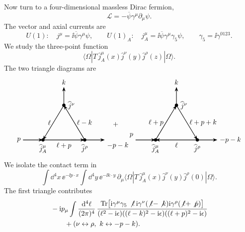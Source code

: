 Now turn to a four-dimensional massless Dirac fermion,
\[
  \mathcal L=-\overline\psi\gamma^\mu\partial_\mu\psi .
\]
The vector and axial currents are
\[
  U(1):\quad
  j^\mu=\ii\overline\psi\gamma^\mu\psi ,
  \qquad
  U(1)_A:\quad
  j_A^\mu=\ii\overline\psi\gamma^\mu\gamma_5\psi ,
  \qquad
  \gamma_5=\ii\gamma^{0123}.
\]
We study the three-point function
\[
  \langle\Omega|
  T\,\widehat j_A^\mu(x)\widehat j^\nu(y)\widehat j^\rho(z)
  |\Omega\rangle .
\]
The two triangle diagrams are
\[
\begin{tikzpicture}[>=Stealth,scale=0.92,baseline={(0,-0.2)},
  fermion/.style={line width=0.75pt},
  current/.style={circle,fill=black,inner sep=1.7pt}]
  \coordinate (A) at (-1.15,-0.85);
  \coordinate (B) at (1.15,-0.85);
  \coordinate (C) at (0,1.05);
  \draw[fermion,->] (A) -- node[below] {\(\ell+p\)} (B);
  \draw[fermion,->] (B) -- node[right] {\(\ell-k\)} (C);
  \draw[fermion,->] (C) -- node[left] {\(\ell\)} (A);
  \draw[fermion,->] (-2.25,-0.85) -- (A);
  \draw[fermion,->] (B) -- (2.25,-0.85);
  \draw[fermion,->] (C) -- (0,2.05);
  \node[current,label=below:\(\widehat j_A^\mu\)] at (A) {};
  \node[current,label=below:\(\widehat j^\rho\)] at (B) {};
  \node[current,label=right:\(\widehat j^\nu\)] at (C) {};
  \node[left] at (-2.25,-0.85) {\(p\)};
  \node[below right] at (2.25,-0.85) {\(-p-k\)};
  \node[above] at (0,2.05) {\(k\)};
  \node at (2.85,0) {\(+\)};
  \begin{scope}[xshift=6.2cm]
    \coordinate (A2) at (-1.15,-0.85);
    \coordinate (B2) at (1.15,-0.85);
    \coordinate (C2) at (0,1.05);
    \draw[fermion,->] (B2) -- node[below] {\(\ell\)} (A2);
    \draw[fermion,->] (A2) -- node[left] {\(\ell+p\)} (C2);
    \draw[fermion,->] (C2) -- node[right] {\(\ell+p+k\)} (B2);
    \draw[fermion,->] (-2.25,-0.85) -- (A2);
    \draw[fermion,->] (B2) -- (2.25,-0.85);
    \draw[fermion,->] (C2) -- (0,2.05);
    \node[current,label=below:\(\widehat j_A^\mu\)] at (A2) {};
    \node[current,label=below:\(\widehat j^\rho\)] at (B2) {};
    \node[current,label=right:\(\widehat j^\nu\)] at (C2) {};
    \node[above left] at (-2.25,-0.85) {\(p\)};
    \node[right] at (2.25,-0.85) {\(-p-k\)};
    \node[above] at (0,2.05) {\(k\)};
  \end{scope}
\end{tikzpicture}
\]
We isolate the contact term in
\[
  \int\dd^4x\,\ee^{-\ii p\cdot x}
  \int\dd^4y\,\ee^{-\ii k\cdot y}\,
  \partial_\mu
  \langle\Omega|
  T\,\widehat j_A^\mu(x)\widehat j^\nu(y)\widehat j^\rho(0)
  |\Omega\rangle .
\]
The first triangle contributes
\[
\begin{aligned}
  &-\mathrm{i} p_\mu
  \int\frac{\mathrm{d}^4\ell}{(2\pi)^4}\,
  \frac{
    \operatorname{Tr}\bigl[
      \mathrm{i}\gamma^\mu\gamma_5\,\not\ell\,
      \mathrm{i}\gamma^\nu(\not\ell-\not k)
      \mathrm{i}\gamma^\rho(\not\ell+\not p)
    \bigr]
  }{
    (\ell^2-\mathrm{i}\epsilon)
    ((\ell-k)^2-\mathrm{i}\epsilon)
    ((\ell+p)^2-\mathrm{i}\epsilon)
  }
\\
  &\qquad
  +(\nu\leftrightarrow\rho,\ k\leftrightarrow -p-k).
\end{aligned}
\]
